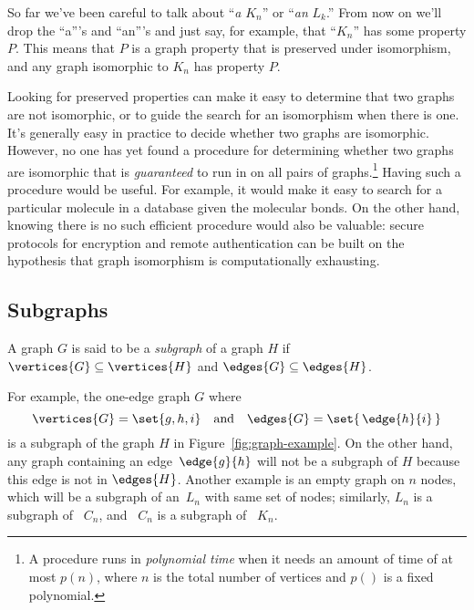  So far we've been careful to talk about ``\emph{a} $K_n$'' or
``\emph{an} $L_k$.''  From now on we'll drop the ``a'''s and ``an'''s
and just say, for example, that ``$K_n$'' has some property $P$.  This
means that $P$ is a graph property that is preserved under isomorphism,
and any graph isomorphic to $K_n$ has property $P$.

Looking for preserved properties can make it easy to determine that two
graphs are not isomorphic, or to guide the search for an 
isomorphism when there is one.  It's generally easy in practice to decide
whether two graphs are isomorphic.  However, no one has yet found a
procedure for determining whether two graphs are isomorphic that is
\emph{guaranteed} to run in  on all pairs of
graphs.\footnote{ A procedure runs in \emph{polynomial
    time} when it needs an amount of time of at most $ p(n)$, where
  $n$ is the total number of vertices and $p()$ is a fixed polynomial.}
Having such a procedure would be useful.  For example, it would make it
easy to search for a particular molecule in a database given the molecular
bonds.  On the other hand, knowing there is no such efficient procedure
would also be valuable: secure protocols for encryption and remote
authentication can be built on the hypothesis that graph isomorphism is
computationally exhausting.

\subsection{Subgraphs}

\begin{definition}\label{def:subgraph}
  A graph $G$ is said to be a \emph{subgraph} of a graph $H$ if
  $\vertices{G} \subseteq \vertices{H}$ and $\edges{G} \subseteq
  \edges{H}$.
\end{definition}

For example, the one-edge graph $G$ where
\begin{equation*}
   \vertices{G} = \set{ g, h, i } \quad \text{and}\quad  \edges{G} =
   \set{\, \edge{h}{i} \, }
\end{equation*}
is a subgraph of the graph $H$ in Figure~\ref{fig:graph-example}.  On the
other hand, any graph containing an edge~$\edge{g}{h}$ will not be a
subgraph of $H$ because this edge is not in $\edges{H}$.  Another example
is an empty graph on $n$ nodes, which will be a subgraph of an~$L_n$ with
same set of nodes; similarly, $L_n$ is a subgraph of ~$C_n$, and ~$C_n$ is
a subgraph of ~$K_n$.

